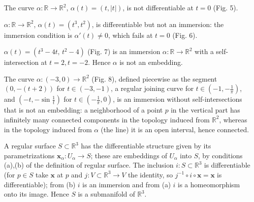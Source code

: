 \begin{example}
  \label{ex:dc-ch0-3-2}
  \notready
  The curve $\alpha:\mathbb{R}\to\mathbb{R}^2$, $\alpha(t)=(t,|t|)$, is not
  differentiable at $t=0$ (Fig. 5).
\end{example}

\begin{example}
  \label{ex:dc-ch0-3-3}
  \notready
  $\alpha:\mathbb{R}\to\mathbb{R}^2$, $\alpha(t)=(t^3,t^2)$, is differentiable but
  not an immersion: the immersion condition is $\alpha'(t)\neq0$, which fails at
  $t=0$ (Fig. 6).
\end{example}

\begin{example}
  \label{ex:dc-ch0-3-4}
  \notready
  $\alpha(t)=(t^3-4t,\,t^2-4)$ (Fig. 7) is an immersion
  $\alpha:\mathbb{R}\to\mathbb{R}^2$ with a self-intersection at $t=2,t=-2$. Hence
  $\alpha$ is not an embedding.
\end{example}

\begin{example}
  \label{ex:dc-ch0-3-5}
  \notready
  The curve $\alpha:(-3,0)\to\mathbb{R}^2$ (Fig. 8), defined piecewise as the
  segment $(0,-(t+2))$ for $t\in(-3,-1)$, a regular joining curve for
  $t\in(-1,-\frac1\pi)$, and $(-t,-\sin\frac1t)$ for $t\in(-\frac1\pi,0)$, is an
  immersion without self-intersections that is not an embedding: a neighborhood of
  a point $p$ in the vertical part has infinitely many connected components in the
  topology induced from $\mathbb{R}^2$, whereas in the topology induced from
  $\alpha$ (the line) it is an open interval, hence connected.
\end{example}

\begin{example}
  \label{ex:dc-ch0-3-6}
  \notready
  A regular surface $S\subset\mathbb{R}^3$ has the differentiable structure given by
  its parametrizations $\mathbf{x}_\alpha:U_\alpha\to S$; these are embeddings of
  $U_\alpha$ into $S$, by conditions (a),(b) of the definition of regular surface.
  The inclusion $i:S\subset\mathbb{R}^3$ is differentiable (for $p\in S$ take
  $\mathbf{x}$ at $p$ and $j:V\subset\mathbb{R}^3\to V$ the identity, so
  $j^{-1}\circ i\circ\mathbf{x}=\mathbf{x}$ is differentiable); from (b) $i$ is an
  immersion and from (a) $i$ is a homeomorphism onto its image. Hence $S$ is a
  submanifold of $\mathbb{R}^3$.
\end{example}

